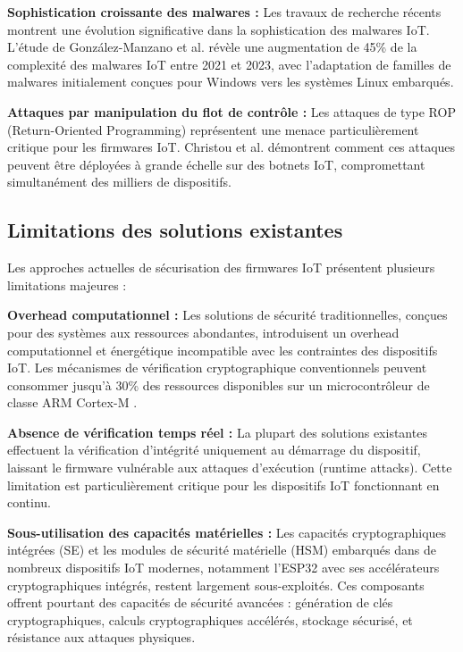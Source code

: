 \textbf{Sophistication croissante des malwares :} Les travaux de recherche récents montrent une évolution significative dans la sophistication des malwares IoT. L'étude de González-Manzano et al. \cite{Gonzalez2024ExploringShifting} révèle une augmentation de 45\% de la complexité des malwares IoT entre 2021 et 2023, avec l'adaptation de familles de malwares initialement conçues pour Windows vers les systèmes Linux embarqués.

\textbf{Attaques par manipulation du flot de contrôle :} Les attaques de type \ac{ROP} (Return-Oriented Programming) représentent une menace particulièrement critique pour les firmwares IoT. Christou et al. \cite{Christou2024DAEDALUS} démontrent comment ces attaques peuvent être déployées à grande échelle sur des botnets IoT, compromettant simultanément des milliers de dispositifs.

\subsection{Limitations des solutions existantes}

Les approches actuelles de sécurisation des firmwares IoT présentent plusieurs limitations majeures :

\textbf{Overhead computationnel :} Les solutions de sécurité traditionnelles, conçues pour des systèmes aux ressources abondantes, introduisent un overhead computationnel et énergétique incompatible avec les contraintes des dispositifs IoT. Les mécanismes de vérification cryptographique conventionnels peuvent consommer jusqu'à 30\% des ressources disponibles sur un microcontrôleur de classe ARM Cortex-M \cite{Khan2024EfficiencySecurity}.

\textbf{Absence de vérification temps réel :} La plupart des solutions existantes effectuent la vérification d'intégrité uniquement au démarrage du dispositif, laissant le firmware vulnérable aux attaques d'exécution (runtime attacks). Cette limitation est particulièrement critique pour les dispositifs IoT fonctionnant en continu.

\textbf{Sous-utilisation des capacités matérielles :} Les capacités cryptographiques intégrées (\ac{SE}) et les modules de sécurité matérielle (\ac{HSM}) embarqués dans de nombreux dispositifs IoT modernes, notamment l'ESP32 avec ses accélérateurs cryptographiques intégrés, restent largement sous-exploités. Ces composants offrent pourtant des capacités de sécurité avancées : génération de clés cryptographiques, calculs cryptographiques accélérés, stockage sécurisé, et résistance aux attaques physiques.

